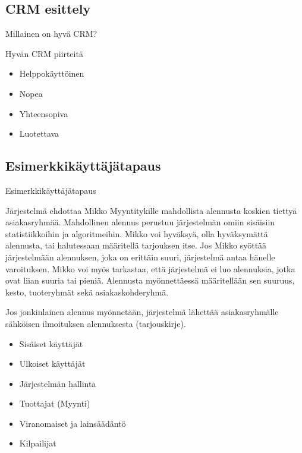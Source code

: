\documentclass{beamer}
\begin{document}
\subsection{CRM esittely}

\begin{frame}{Millainen on hyvä CRM?}

Hyvän CRM piirteitä

	\begin{itemize}
		\item<2-> Helppokäyttöinen
		\item<3-> Nopea
		\item<4-> Yhteensopiva
		\item<5-> Luotettava
	\end{itemize}
\end{frame}

\subsection{Esimerkkikäyttäjätapaus}

\begin{frame}{Esimerkkikäyttäjätapaus}

	Järjestelmä ehdottaa Mikko Myyntitykille mahdollista alennusta koskien tiettyä asiakasryhmää.
	Mahdollinen alennus perustuu järjestelmän omiin sisäisiin statistiikkoihin ja algoritmeihin.
	Mikko voi hyväksyä, olla hyväksymättä alennusta, tai halutessaan määritellä tarjouksen itse.
	Jos Mikko syöttää järjestelmään alennuksen, joka on erittäin suuri, järjestelmä antaa hänelle varoituksen.
	Mikko voi myös tarkastaa, että järjestelmä ei luo alennuksia, jotka ovat liian suuria tai pieniä.
	Alennusta myönnettäessä määritellään sen suuruus, kesto, tuoteryhmät sekä asiakaskohderyhmä.

	Jos jonkinlainen alennus myönnetään, järjestelmä lähettää asiakasryhmälle sähköisen ilmoituksen alennuksesta (tarjouskirje).
	
\begin{itemize}
	\item Sisäiset käyttäjät
	\item Ulkoiset käyttäjät
	\item Järjestelmän hallinta
	\item Tuottajat (Myynti)
	\item Viranomaiset ja lainsäädäntö
	\item Kilpailijat
\end{itemize}
\end{frame}
\end{document}
